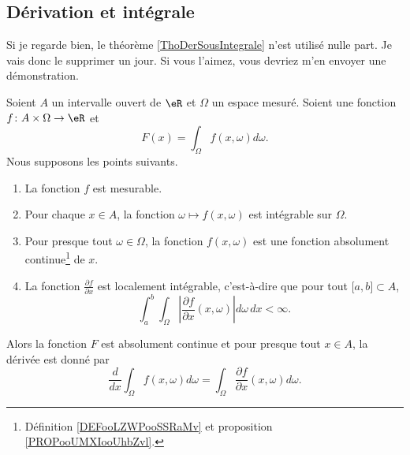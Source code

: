 \subsection{Dérivation et intégrale}


\begin{probleme}		\label{PROBooGVWHooOTNJFe}
	Si je regarde bien, le théorème \ref{ThoDerSousIntegrale} n'est utilisé nulle part. Je vais donc le supprimer un jour. Si vous l'aimez, vous devriez m'en envoyer une démonstration.
\end{probleme}


\begin{theorem}     \label{ThoDerSousIntegrale}
	Soient \( A\) un intervalle ouvert de \( \eR\) et \( \Omega\) un espace mesuré. Soient une fonction \( f\colon A\times \Omega\to \eR\) et
	\begin{equation}
		F(x)=\int_{\Omega}f(x,\omega)d\omega.
	\end{equation}
	Nous supposons les points suivants.
	\begin{enumerate}
		\item
		      La fonction \( f\) est mesurable.
		\item
		      Pour chaque \( x\in A\), la fonction  \( \omega\mapsto f(x,\omega)\) est intégrable sur \( \Omega\).
		\item
		      Pour presque tout \( \omega\in\Omega\), la fonction \( f(x,\omega)\) est une fonction absolument continue\footnote{Définition \ref{DEFooLZWPooSSRaMv} et proposition \ref{PROPooUMXIooUhbZvl}.} de \( x\).
		\item
		      La fonction \( \frac{ \partial f }{ \partial x }\) est localement intégrable, c'est-à-dire que pour tout \( \mathopen[ a , b \mathclose]\subset A\),
		      \begin{equation}
			      \int_a^b\int_{\Omega}\left| \frac{ \partial f }{ \partial x }(x,\omega) \right| d\omega\,dx<\infty.
		      \end{equation}
	\end{enumerate}
	Alors la fonction \( F\) est absolument continue et pour presque tout \( x\in A\), la dérivée est donné par
	\begin{equation}
		\frac{ d }{ dx }\int_{\Omega}f(x,\omega)d\omega=\int_{\Omega}\frac{ \partial f }{ \partial x }(x,\omega)d\omega.
	\end{equation}
\end{theorem}

